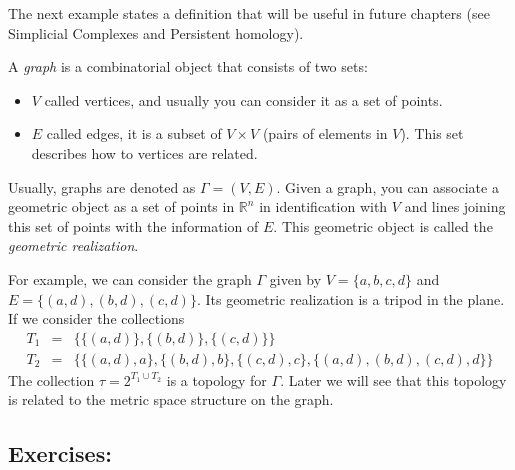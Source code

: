 \documentclass[
	fontsize=10pt, %
	twoside=false, %
	secnumdepth=1, %
]{kaobook}
\begin{document}
The next example states a definition that will be useful in future chapters (see Simplicial Complexes and Persistent homology). 

\begin{example}
A \emph{graph} is a combinatorial object that consists of two sets:
\begin{itemize}
\item $V$ called vertices, and usually you can consider it as a set of points.
\item $E$ called edges, it is a subset of $V\times V$ (pairs of elements in $V$). This set describes how to vertices are related.
\end{itemize}
 
 Usually, graphs are denoted as $\Gamma=(V, E).$ Given a graph, you can associate a geometric object as a set of points in $\mathbb{R}^n$ in identification with $V$ and lines joining this set of points with the information of $E.$ This geometric object is called the \emph{geometric realization}.
 
 
 For example, we can consider the graph $\Gamma$ given by $V=\{a,b,c,d\}$ and $E=\{(a,d),(b,d),(c,d)\}.$ Its geometric realization is a tripod in the plane. If we consider the collections
 \begin{eqnarray*}
 T_1 & =& \{\{(a,d)\},\{(b,d)\},\{(c,d)\}\} \\
 T_2 & = &\{\{(a,d),a\},\{(b,d),b\},\{(c,d),c\},\{(a,d),(b,d),(c,d),d\}\}
 \end{eqnarray*}
 The collection $\tau=2^{T_1\cup T_2}$ is a topology for $\Gamma.$ Later we will see that this topology is related to the metric space structure on the graph.
\end{example}

\subsection{Exercises:}
\end{document}
